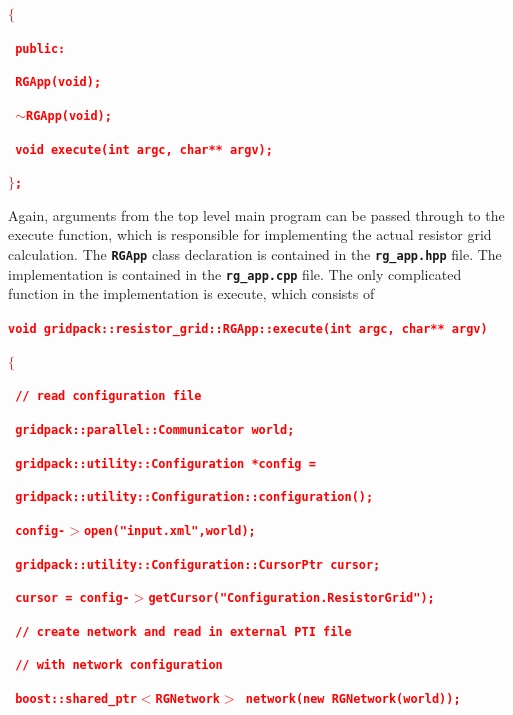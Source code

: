 \documentclass[12pt]{report} %
\begin{document}
\textcolor{red}{\texttt{\textbf{$\boldsymbol{\mathrm{\{}}$}}}

\textcolor{red}{\texttt{\textbf{  public:}}}

\textcolor{red}{\texttt{\textbf{    RGApp(void);}}}

\textcolor{red}{\texttt{\textbf{    $\boldsymbol{\mathrm{\sim}}$RGApp(void);}}}

\textcolor{red}{\texttt{\textbf{    void execute(int argc, char** argv);}}}

\textcolor{red}{\texttt{\textbf{$\boldsymbol{\mathrm{\}}}$;}}}

Again, arguments from the top level main program can be passed through to the execute function, which is responsible for implementing the actual resistor grid calculation. The \texttt{\textbf{RGApp}} class declaration is contained in the \texttt{\textbf{rg\_app.hpp}} file. The implementation is contained in the \texttt{\textbf{rg\_app.cpp}} file. The only complicated function in the implementation is execute, which consists of

\textcolor{red}{\texttt{\textbf{void gridpack::resistor\_grid::RGApp::execute(int argc, char** argv)}}}

\textcolor{red}{\texttt{\textbf{$\boldsymbol{\mathrm{\{}}$}}}

\textcolor{red}{\texttt{\textbf{  // read configuration file}}}

\textcolor{red}{\texttt{\textbf{  gridpack::parallel::Communicator world;}}}

\textcolor{red}{\texttt{\textbf{  gridpack::utility::Configuration *config =}}}

\textcolor{red}{\texttt{\textbf{    gridpack::utility::Configuration::configuration();}}}

\textcolor{red}{\texttt{\textbf{  config-$\boldsymbol{\mathrm{>}}$open("input.xml",world);}}}

\textcolor{red}{\texttt{\textbf{  gridpack::utility::Configuration::CursorPtr cursor;}}}

\textcolor{red}{\texttt{\textbf{  cursor = config-$\boldsymbol{\mathrm{>}}$getCursor("Configuration.ResistorGrid");}}}

\textcolor{red}{\texttt{\textbf{}}}

\textcolor{red}{\texttt{\textbf{  // create network and read in external PTI file}}}

\textcolor{red}{\texttt{\textbf{  // with network configuration}}}

\textcolor{red}{\texttt{\textbf{  boost::shared\_ptr$\boldsymbol{\mathrm{<}}$RGNetwork$\boldsymbol{\mathrm{>}}$ network(new RGNetwork(world));}}}
\end{document}
